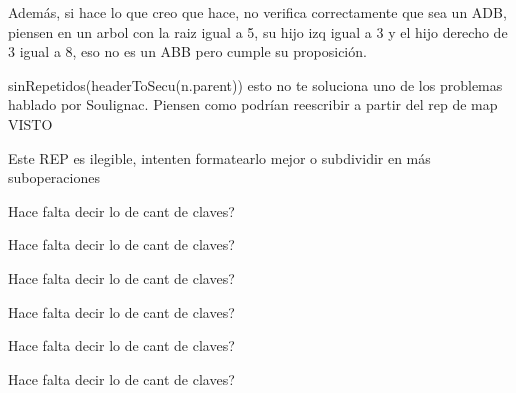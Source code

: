 \begin{DoxyRefList}
Además, si hace lo que creo que hace, no verifica correctamente que sea un A\+DB, piensen en un arbol con la raiz igual a 5, su hijo izq igual a 3 y el hijo derecho de 3 igual a 8, eso no es un A\+BB pero cumple su proposición.

sin\+Repetidos(header\+To\+Secu(n.\+parent)) esto no te soluciona uno de los problemas hablado por Soulignac. Piensen como podrían reescribir a partir del rep de map V\+I\+S\+TO 
\item[\label{deprecated__deprecated000020}%
\hypertarget{deprecated__deprecated000020}{}%
Grupo \hyperlink{classaed2_1_1map_amgrpd5e8970aaf64693c88c5cfe5802755da}{Estructura de representación} ]Este R\+EP es ilegible, intenten formatearlo mejor o subdividir en más suboperaciones

Hace falta decir lo de cant de claves?

Hace falta decir lo de cant de claves?

Hace falta decir lo de cant de claves?

Hace falta decir lo de cant de claves?

Hace falta decir lo de cant de claves?

Hace falta decir lo de cant de claves?
\end{DoxyRefList}